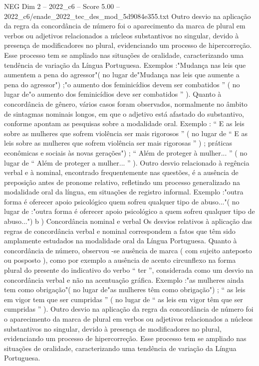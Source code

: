 \begin{textsample}{NEG Dim 2 – 2022\_c6 – Score 5.00 – 2022\_c6/enade\_2022\_tec\_des\_mod\_5d9084e355.txt}
Outro desvio na aplicação da regra da concordância de número foi o aparecimento da marca de plural em verbos ou adjetivos relacionados a núcleos substantivos no singular, devido à presença de modificadores no plural, evidenciando um processo de hipercorreção.
Esse processo tem se ampliado nas situações de oralidade, caracterizando uma tendência de variação da Língua Portuguesa.
Exemplos :"Mudança nas leis que aumentem a pena do agressor"( no lugar de"Mudança nas leis que aumente a pena do agressor") ;"o aumento dos feminicídios devem ser combatidos ” ( no lugar de"o aumento dos feminicídios deve ser combatidos ” ).
Quanto à concordância de gênero, vários casos foram observados, normalmente no âmbito de sintagmas nominais longos, em que o adjetivo está afastado do substantivo, conforme apontam as pesquisas sobre a modalidade oral.
Exemplo : “ E as leis sobre as mulheres que sofrem violência ser mais rigorosos ” ( no lugar de “ E as leis sobre as mulheres que sofrem violência ser mais rigorosas ” ) ; práticas econômicas e sociais às novas gerações") ; “ Além de proteger à mulher... ” ( no lugar de “ Além de proteger a mulher... ” ).
Outro desvio relacionado à regência verbal e à nominal, encontrado frequentemente nas questões, é a ausência de preposição antes de pronome relativo, refletindo um processo generalizado na modalidade oral da língua, em situações de registro informal.
Exemplo :"outra forma é oferecer apoio psicológico quem sofreu qualquer tipo de abuso..."( no lugar de :"outra forma é oferecer apoio psicológico a quem sofreu qualquer tipo de abuso...") b ) Concordância nominal e verbal Os desvios relativos à aplicação das regras de concordância verbal e nominal correspondem a fatos que têm sido amplamente estudados na modalidade oral da Língua Portuguesa.
Quanto à concordância de número, observou -se ausência de marca ( com sujeito anteposto ou posposto ), como por exemplo a ausência de acento circunflexo na forma plural do presente do indicativo do verbo “ ter ”, considerada como um desvio na concordância verbal e não na acentuação gráfica.
Exemplo :"as mulheres ainda tem como obrigação"( no lugar de"as mulheres têm como obrigação") ; “ as leis em vigor tem que ser cumpridas ” ( no lugar de “ as leis em vigor têm que ser cumpridas ” ).
Outro desvio na aplicação da regra da concordância de número foi o aparecimento da marca de plural em verbos ou adjetivos relacionados a núcleos substantivos no singular, devido à presença de modificadores no plural, evidenciando um processo de hipercorreção.
Esse processo tem se ampliado nas situações de oralidade, caracterizando uma tendência de variação da Língua Portuguesa.

\end{textsample}
